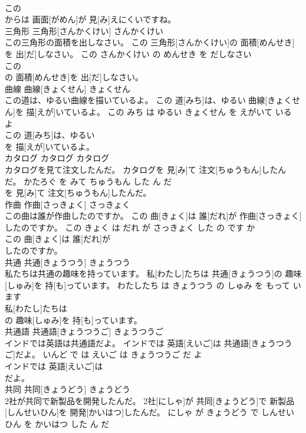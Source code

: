 \documentclass[8pt]{extreport}
\begin{document}
\begin{CJK}{UTF8}{min}
\\	この
\\	からは 画面[がめん]が 見[み]えにくいですね。			
\\	三角形	三角形[さんかくけい]	さんかくけい	
\\	この三角形の面積を出しなさい。	この 三角形[さんかくけい]の 面積[めんせき]を 出[だ]しなさい。	この さんかくけい の めんせき を だしなさい	
\\	この
\\	の 面積[めんせき]を 出[だ]しなさい。			
\\	曲線	曲線[きょくせん]	きょくせん	
\\	この道は、ゆるい曲線を描いているよ。	この 道[みち]は、ゆるい 曲線[きょくせん]を 描[えが]いているよ。	この みち は ゆるい きょくせん を えがいて いる よ	
\\	この 道[みち]は、ゆるい
\\	を 描[えが]いているよ。			
\\	カタログ	カタログ	カタログ	
\\	カタログを見て注文したんだ。	カタログを 見[み]て 注文[ちゅうもん]したんだ。	かたろぐ を みて ちゅうもん した ん だ	
\\	を 見[み]て 注文[ちゅうもん]したんだ。			
\\	作曲	作曲[さっきょく]	さっきょく	
\\	この曲は誰が作曲したのですか。	この 曲[きょく]は 誰[だれ]が 作曲[さっきょく]したのですか。	この きょく は だれ が さっきょく した の です か	
\\	この 曲[きょく]は 誰[だれ]が
\\	したのですか。			
\\	共通	共通[きょうつう]	きょうつう	
\\	私たちは共通の趣味を持っています。	私[わたし]たちは 共通[きょうつう]の 趣味[しゅみ]を 持[も]っています。	わたしたち は きょうつう の しゅみ を もって います	
\\	私[わたし]たちは
\\	の 趣味[しゅみ]を 持[も]っています。			
\\	共通語	共通語[きょうつうご]	きょうつうご	
\\	インドでは英語は共通語だよ。	インドでは 英語[えいご]は 共通語[きょうつうご]だよ。	いんど で は えいご は きょうつうご だ よ	
\\	インドでは 英語[えいご]は
\\	だよ。			
\\	共同	共同[きょうどう]	きょうどう	
\\	2社が共同で新製品を開発したんだ。	2社[にしゃ]が 共同[きょうどう]で 新製品[しんせいひん]を 開発[かいはつ]したんだ。	にしゃ が きょうどう で しんせいひん を かいはつ した ん だ	

\end{CJK}
\end{document}
